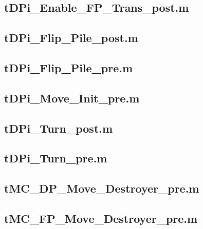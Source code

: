 \documentclass[runningheads,a4paper]{llncs}
\newcommand{\GPenSIM}{../GPenSIM}
\begin{document}
\subsection{tDPi\_Enable\_FP\_Trans\_post.m}
\label{app:tDPi_Enable_FP_Trans_post}


\subsection{tDPi\_Flip\_Pile\_post.m}
\label{app:tDPi_Flip_Pile_post}


\subsection{tDPi\_Flip\_Pile\_pre.m}
\label{app:tDPi_Flip_Pile_pre}


\subsection{tDPi\_Move\_Init\_pre.m}
\label{app:tDPi_Move_Init_pre}


\subsection{tDPi\_Turn\_post.m}
\label{app:tDPi_Turn_post}


\subsection{tDPi\_Turn\_pre.m}
\label{app:tDPi_Turn_pre}


\subsection{tMC\_DP\_Move\_Destroyer\_pre.m}
\label{app:tMC_DP_Move_Destroyer_pre}


\subsection{tMC\_FP\_Move\_Destroyer\_pre.m}
\label{app:tMC_FP_Move_Destroyer_pre}

\end{document}
